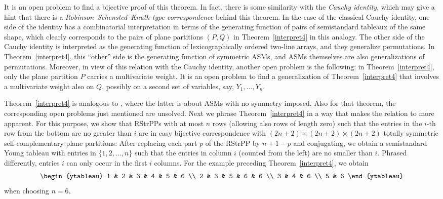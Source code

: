 \documentclass[12pt]{amsart}
\theoremstyle{definition}
\numberwithin{equation}{section}
\newcommand{\RSPP}{RStrPP\xspace}
\newcommand{\RSPPs}{RStrPPs\xspace}
\begin{document}
It is an open problem to find a bijective proof of this theorem. In fact, there is some similarity with the \emph{Cauchy identity}, which may give a hint that there is a \emph{Robinson--Schensted--Knuth-type correspondence} behind this theorem. In the case of the classical Cauchy identity, one side of the identity has a combinatorial interpretation 
in terms of the generating function of pairs of semistandard tableaux of the same shape, which clearly corresponds  to the pairs of plane partitions 
$(P,Q)$ in Theorem~\ref{interpret4} in this analogy. The other side of the Cauchy identity is interpreted as the generating function of lexicographically ordered two-line arrays, and they generalize 
permutations. In Theorem~\ref{interpret4}, this ``other'' side is the generating function of symmetric ASMs, and ASMs themselves are also generalizations 
of permutations. Moreover, in view of this relation with the Cauchy identity, another open problem is the following: in Theorem~\ref{interpret4}, only the plane partition $P$ carries a multivariate weight. It is an open problem to find a generalization of Theorem~\ref{interpret4} that involves a multivariate 
weight also on $Q$, possibly on a second set of variables, say, $Y_1,\ldots,Y_n$. 

Theorem~\ref{interpret4} is analogous to \cite[Theorem 1.1]{TSPP}, where the latter is about ASMs with no symmetry imposed. Also for that theorem, 
the corresponding open problems just mentioned are unsolved. Next we phrase Theorem~\ref{interpret4} in a way that makes the relation to \cite[Theorem 1.1]{TSPP} more 
apparent. For this purpose, we show that
\RSPPs with at most $n$ rows (allowing also rows of length zero) such that the entries in the $i$-th row from the bottom are no greater than $i$
are in easy bijective correspondence with $(2n+2) \times (2n+2) \times (2n+2)$ {totally symmetric self-complementary plane partitions}: 
After replacing each part $p$ of the \RSPP
by  $n+1-p$ and conjugating, we obtain a semistandard Young tableau with entries in $\{1,2,\ldots,n\}$ 
such that the entries in column $i$ (counted from the left) are no smaller than $i$. Phrased differently, entries $i$ can only occur in the first $i$ columns. For the example preceding Theorem~\ref{interpret4}, we obtain 
\[
\begin{ytableau}
 1 & 2 & 3 & 4 & 5 & 6 \\
 2  & 3  & 5   &  6 & 6  \\
 3  & 4   & 6   \\
 5  & 6  
 \end{ytableau} 
\]
when choosing $n=6$.
\end{document}
